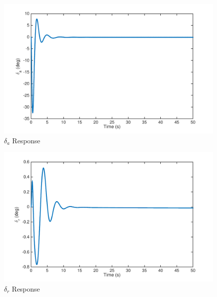 \documentclass[12pt]{article}
\begin{document}
\clearpage
\begin{figure}[h!]
\begin{center}
\includegraphics[height=.4\textheight]{figures/delta_a}
\caption{$\delta_a$ Response}
\end{center}
\end{figure}

\begin{figure}[h!]
\begin{center}
\includegraphics[height=.4\textheight]{figures/delta_r}
\caption{$\delta_r$ Response}
\end{center}
\end{figure}
\end{document}
